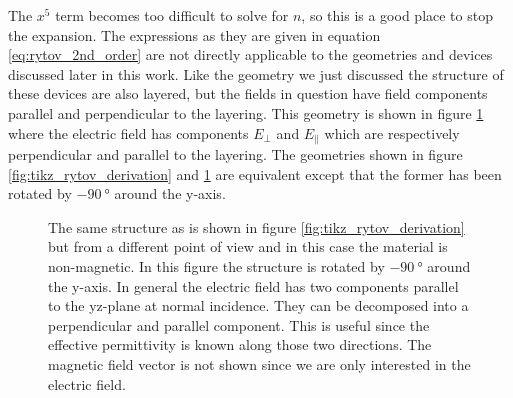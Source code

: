The $x^5$ term becomes too difficult to solve for $n$, so this is a good place to stop the expansion. The expressions as they are given in equation \ref{eq:rytov_2nd_order} are not directly applicable to the geometries and devices discussed later in this work. Like the geometry we just discussed the structure of these devices are also layered, but the fields in question have field components parallel and perpendicular to the layering. This geometry is shown in figure \ref{fig:stratified_structure} where the electric field has components $E_{\bot}$ and $E_{\parallel}$ which are respectively perpendicular and parallel to the layering. The geometries shown in figure \ref{fig:tikz_rytov_derivation} and \ref{fig:stratified_structure} are equivalent except that the former has been rotated by $\SI{-90}{\degree}$ around the y-axis. 

\begin{figure}[h]
    \centering
    
    \caption{The same structure as is shown in figure \ref{fig:tikz_rytov_derivation} but from a different point of view and in this case the material is non-magnetic. In this figure the structure is rotated by $\SI{-90}{\degree}$ around the y-axis. In general the electric field has two components parallel to the yz-plane at normal incidence. They can be decomposed into a perpendicular and parallel component. This is useful since the effective permittivity is known along those two directions. The magnetic field vector is not shown since we are only interested in the electric field.}
    \label{fig:stratified_structure}
\end{figure}


